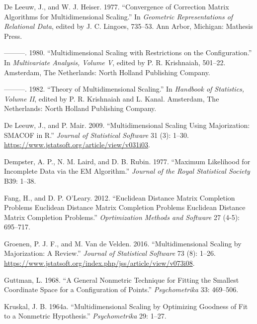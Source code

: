 \documentclass[
  12pt,
]{article}
\newlength{\cslhangindent}
\newenvironment{CSLReferences}[2] %
 {\begin{list}{}{%
  \setlength{\itemindent}{0pt}
  \setlength{\leftmargin}{0pt}
  \setlength{\parsep}{0pt}
  \ifodd #1
   \setlength{\leftmargin}{\cslhangindent}
   \setlength{\itemindent}{-1\cslhangindent}
  \fi
  \setlength{\itemsep}{#2\baselineskip}}}
 {\end{list}}
\begin{document}
\begin{CSLReferences}{1}{0}
De Leeuw, J., and W. J. Heiser. 1977. {``Convergence of Correction Matrix Algorithms for Multidimensional Scaling.''} In \emph{Geometric Representations of Relational Data}, edited by J. C. Lingoes, 735--53. Ann Arbor, Michigan: Mathesis Press.

---------. 1980. {``Multidimensional Scaling with Restrictions on the Configuration.''} In \emph{Multivariate Analysis, Volume {V}}, edited by P. R. Krishnaiah, 501--22. Amsterdam, The Netherlands: North Holland Publishing Company.

---------. 1982. {``Theory of Multidimensional Scaling.''} In \emph{Handbook of Statistics, Volume {II}}, edited by P. R. Krishnaiah and L. Kanal. Amsterdam, The Netherlands: North Holland Publishing Company.

De Leeuw, J., and P. Mair. 2009. {``{Multidimensional Scaling Using Majorization: SMACOF in R}.''} \emph{Journal of Statistical Software} 31 (3): 1--30. \url{https://www.jstatsoft.org/article/view/v031i03}.

Dempster, A. P., N. M. Laird, and D. B. Rubin. 1977. {``{Maximum Likelihood for Incomplete Data via the EM Algorithm}.''} \emph{Journal of the Royal Statistical Society} B39: 1--38.

Fang, H., and D. P. O'Leary. 2012. {``Euclidean Distance Matrix Completion Problems Euclidean Distance Matrix Completion Problems Euclidean Distance Matrix Completion Problems.''} \emph{Oprtimization Methods and Software} 27 (4-5): 695--717.

Groenen, P. J. F., and M. Van de Velden. 2016. {``{Multidimensional Scaling by Majorization: A Review}.''} \emph{Journal of Statistical Software} 73 (8): 1--26. \url{https://www.jstatsoft.org/index.php/jss/article/view/v073i08}.

Guttman, L. 1968. {``{A General Nonmetric Technique for Fitting the Smallest Coordinate Space for a Configuration of Points}.''} \emph{Psychometrika} 33: 469--506.

Kruskal, J. B. 1964a. {``{Multidimensional Scaling by Optimizing Goodness of Fit to a Nonmetric Hypothesis}.''} \emph{Psychometrika} 29: 1--27.


\end{CSLReferences}
\end{document}
